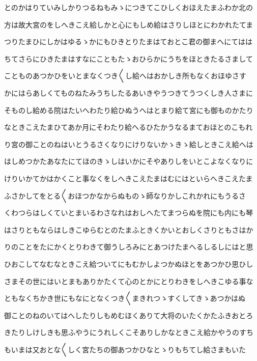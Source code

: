 \documentclass[a4paper,11pt,landscape]{ltjtarticle}
\begin{document}
\par\medskip
とのかはりていみしかりつるねもみゝにつきてこひしくおほえたまふわか北の
\par\medskip
方は故大宮のをしへきこえ給しかと心にもしめ給はさりしほとにわかれたてま
\par\medskip
つりたまひにしかはゆるゝかにもひきとりたまはておとこ君の御まへにてはは
\par\medskip
ちてさらにひきたまはすなにこともたゝおひらかにうちをほときたるさまして
\par\medskip
ことものあつかひをいとまなくつき〱し給へはおかしき所もなくおほゆさす
\par\medskip
かにはらあしくてものねたみうちしたるあいきやうつきてうつくしき人さまに
\par\medskip
そものし給める院はたいへわたり給ひぬうへはとまり給て宮にも御ものかたり
\par\medskip
なときこえたまひてあか月にそわたり給へるひたかうなるまておほとのこもれ
\par\medskip
り宮の御ことのねはいとうるさくなりにけりないかゝきゝ給しときこえ給へは
\par\medskip
はしめつかたあなたにてほのきゝしはいかにそやありしをいとこよなくなりに
\par\medskip
けりいかてかはかくこと事なくをしへきこえたまはむにはといらへきこえたま
\par\medskip
ふさかしてをとる〱おほつかなからぬものゝ師なりかしこれかれにもうるさ
\par\medskip
くわつらはしくていとまいるわさなれはおしへたてまつらぬを院にも内にも琴
\par\medskip
はさりともならはしきこゆらむとのたまふときくかいとおしくさりともさはか
\par\medskip
りのことをたにかくとりわきて御うしろみにとあつけたまへるしるしにはと思
\par\medskip
ひおこしてなむなときこえ給ついてにもむかしよつかぬほとをあつかひ思ひし
\par\medskip
さまその世にはいとまもありかたくて心のとかにとりわきをしへきこゆる事な
\par\medskip
ともなくちかき世にもなにとなくつき〱まきれつゝすくしてきゝあつかはぬ
\par\medskip
御ことのねのいてはへしたりしもめむほくありて大将のいたくかたふきおとろ
\par\medskip
きたりしけしきも思ふやうにうれしくこそありしかなときこえ給かやうのすち
\par\medskip
もいまは又おとな〱しく宮たちの御あつかひなとゝりもちてし給さまもいた
\par\medskip
\end{document}
